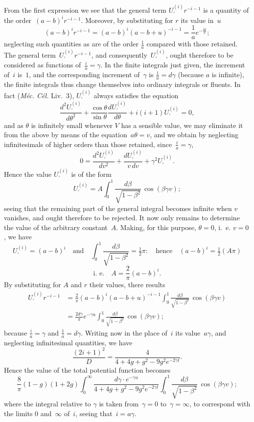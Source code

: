 \documentclass[11pt,notitlepage]{amsart}
\let\Title\textit
\begin{document}
From the first expression we see that the
general term $U_\prime^{(i)}r^{-i-1}$ is
a quantity of the order~$(a-b)^ir^{-i-1}$.
Moreover, by substituting for $r$ its
value in~$u$
\[
(a-b)^ir^{-i-1}=(a-b)^i(a-b+u)^{-i-1}=\frac1ae^{-\frac{iu}{a}};
\]
neglecting such quantities as are
of the order $\frac1a$ compared with those retained.
The general term~$U_\prime^{(i)}r^{-i-1}$, and consequently~$U_\prime^{(i)}$,
ought therefore to be
considered as functions of~${\frac ia=\gamma}$.
In the finite integrals just given, the
increment of~$i$ is~$1$, and the corresponding increment
of~$\gamma$ is $\frac1a=d\gamma$ (because
$a$ is infinite), the finite integrals thus
change themselves into ordinary integrals
or fluents. In fact (\Title{M\'ec. C\'el.} Liv.~3),
$U_\prime^{(i)}$ always satisfies the equation
\[
\frac{d^2U_\prime^{(i)}}{d\theta^2}
+\frac{\cos\theta}{\sin\theta}\frac{dU_\prime^{(i)}}{d\theta}
+i(i+1)U_\prime^{(i)}=0,
\]
and as $\theta$ is infinitely small whenever $V$
has a sensible value, we may eliminate
it from the above by means of the equation~${a\theta=v}$,
and we obtain by
neglecting infinitesimals of higher orders than those retained,
since~${\frac ia=\gamma}$,
\[
0=\frac{d^2U_\prime^{(i)}}{dv^2}
+\frac{dU_\prime^{(i)}}{v\,dv}
+\gamma^2U_\prime^{(i)}.
\]
Hence the value $U_\prime^{(i)}$ is of the form
\[
U_\prime^{(i)}=
A\int_0^1\frac{d\beta}{\sqrt{1-\beta^2}}\,\cos(\beta\gamma v);
\]
seeing that the remaining part of the general integral becomes infinite when $v$
vanishes, and ought therefore to be rejected. It now only remains to determine
the value of the arbitrary constant~$A$. Making, for this purpose, $\theta=0$,
i.~e. $v=0$, we have
\[
U_\prime^{(i)}=(a-b)^i
\quad\text{and}\quad
\int_0^1\frac{d\beta}{\sqrt{1-\beta^2}}=\tfrac12\pi:
\quad\text{hence}\quad
(a-b)^i=\tfrac12(A\pi)
\]
\[
\text{i.~e.}\quad
A=\frac2\pi(a-b)^i.
\]
By substituting for $A$ and $r$ their values, there results
\[
\begin{aligned}
U_\prime^{(i)}r^{-i-1} &=
\frac2\pi(a-b)^i(a-b+u)^{-i-1}
\int_0^1\frac{d\beta}{\sqrt{1-\beta^2}}\,\cos(\beta\gamma v)\\
&=\frac{2d\gamma}{\pi}e^{-\gamma u}
\int_0^1\frac{d\beta}{\sqrt{1-\beta^2}}\,\cos(\beta\gamma v);
\end{aligned}
\]
because $\frac ia=\gamma$ and $\frac1a=d\gamma$.
Writing now in the place of~$i$ its value~$a\gamma$,
and neglecting infinitesimal quantities, we have
\[
\frac{(2i+1)^2}{D}=\frac{4}{4+4g+g^2-9g^2e^{-2\gamma t}}.
\]
Hence the value of the total potential function becomes
\[
\frac8\pi(1-g)(1+2g)
\int_0^\infty\frac{d\gamma\cdot e^{-\gamma u}}{4+4g+g^2-9g^2e^{-2\gamma t}}
\int_0^1\frac{d\beta}{\sqrt{1-\beta^2}}\,\cos(\beta\gamma v);
\]
where the integral relative to $\gamma$ is taken
from~$\gamma=0$ to~$\gamma=\infty$, to correspond
with the limits $0$ and~$\infty$ of~$i$, seeing that~${i=a\gamma}$.
\end{document}
